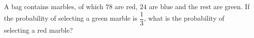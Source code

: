 A bag contains marbles, of which $78$ are red, $24$ are blue and the rest are green. If the probability of selecting a green marble is $\dfrac{1}{3}$, what is the probability of selecting a red marble?
